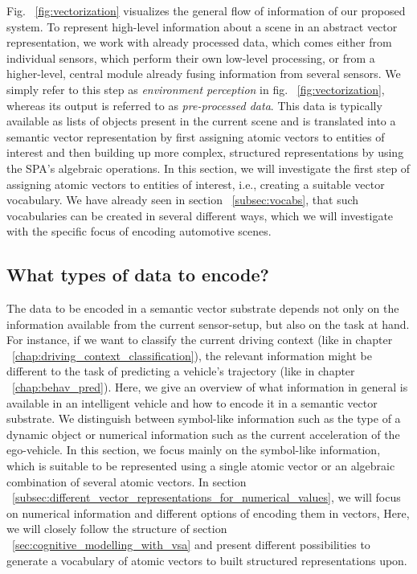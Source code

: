 Fig. ~\ref{fig:vectorization} visualizes the general flow of information of our proposed system.
To represent high-level information about a scene in an abstract vector representation, we work with already processed data, which comes either from individual sensors, which perform their own low-level processing, or from a higher-level, central module already fusing information from several sensors.
We simply refer to this step as \emph{environment perception} in fig. ~\ref{fig:vectorization}, whereas its output is referred to as \emph{pre-processed data}.
This data is typically available as lists of objects present in the current scene and is translated into a semantic vector representation by first assigning atomic vectors to entities of interest and then building up more complex, structured representations by using the \ac{SPA}'s algebraic operations.
In this section, we will investigate the first step of assigning atomic vectors to entities of interest, i.e., creating a suitable vector vocabulary.
We have already seen in section ~\ref{subsec:vocabs}, that such vocabularies can be created in several different ways, which we will investigate with the specific focus of encoding automotive scenes.

\subsection{What types of data to encode?}%
\label{subsec:what_types_of_data_to_encode_}

The data to be encoded in a semantic vector substrate depends not only on the information available from the current sensor-setup, but also on the task at hand.
For instance, if we want to classify the current driving context (like in chapter ~\ref{chap:driving_context_classification}), the relevant information might be different to the task of predicting a vehicle's trajectory (like in chapter ~\ref{chap:behav_pred}).
Here, we give an overview of what information in general is available in an intelligent vehicle and how to encode it in a semantic vector substrate.
We distinguish between symbol-like information such as the type of a dynamic object or numerical information such as the current acceleration of the ego-vehicle.
In this section, we focus mainly on the symbol-like information, which is suitable to be represented using a single atomic vector or an algebraic combination of several atomic vectors.
In section ~\ref{subsec:different_vector_representations_for_numerical_values}, we will focus on numerical information and different options of encoding them in vectors,
Here, we will closely follow the structure of section ~\ref{sec:cognitive_modelling_with_vsa} and present different possibilities to generate a vocabulary of atomic vectors to built structured representations upon.

